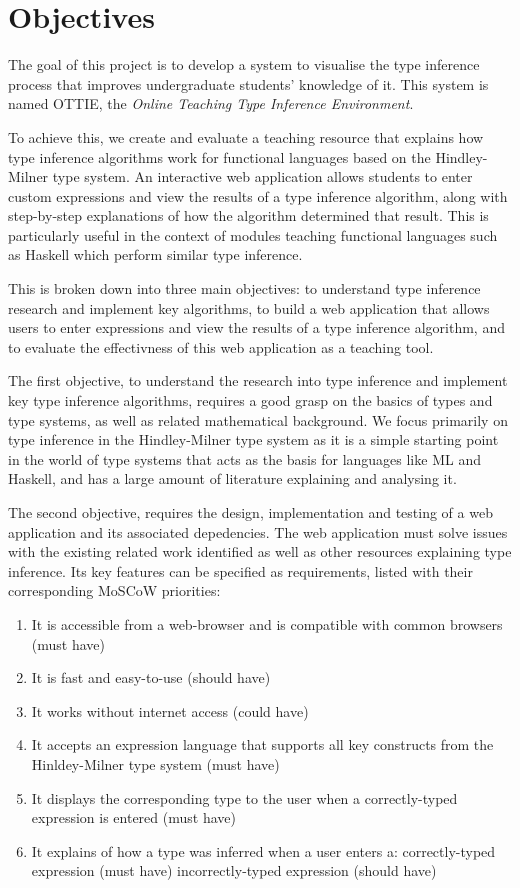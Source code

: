 \documentclass[a4paper,fleqn,oneside,12pt]{report}
\begin{document}
\section{Objectives}

The goal of this project is to develop a system to visualise the type inference process that improves undergraduate students' knowledge of it. This system is named OTTIE, the \textit{Online Teaching Type Inference Environment}.

To achieve this, we create and evaluate a teaching resource that explains how type inference algorithms work for functional languages based on the Hindley-Milner type system. An interactive web application allows students to enter custom expressions and view the results of a type inference algorithm, along with step-by-step explanations of how the algorithm determined that result. This is particularly useful in the context of modules teaching functional languages such as Haskell which perform similar type inference.

This is broken down into three main objectives: to understand type inference research and implement key algorithms, to build a web application that allows users to enter expressions and view the results of a type inference algorithm, and to evaluate the effectivness of this web application as a teaching tool.

The first objective, to understand the research into type inference and implement key type inference algorithms, requires a good grasp on the basics of types and type systems, as well as related mathematical background. We focus primarily on type inference in the Hindley-Milner type system as it is a simple starting point in the world of type systems that acts as the basis for languages like ML and Haskell, and has a large amount of literature explaining and analysing it.

The second objective, requires the design, implementation and testing of a web application and its associated depedencies. The web application must solve issues with the existing related work identified as well as other resources explaining type inference. Its key features can be specified as requirements, listed with their corresponding MoSCoW priorities:

\begin{enumerate}
  \item It is accessible from a web-browser and is compatible with common browsers (must have)
  \item It is fast and easy-to-use (should have)
  \item It works without internet access (could have)
  \item It accepts an expression language that supports all key constructs from the Hinldey-Milner type system (must have)
  \item It displays the corresponding type to the user when a correctly-typed expression is entered (must have)
  \item It explains of how a type was inferred when a user enters a:
    \subitem correctly-typed expression (must have)
    \subitem incorrectly-typed expression (should have)
\end{enumerate}
\end{document}
